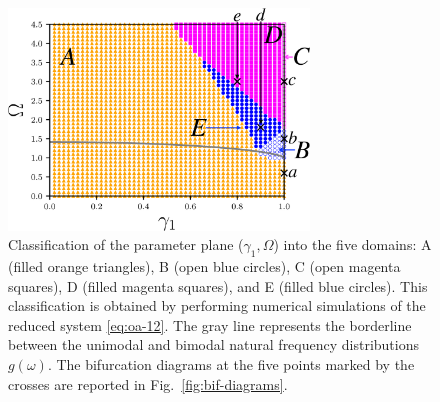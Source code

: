 \begin{figure}
  \centering
  \includegraphics[width=8cm]{figs/pd-na.eps}
  \caption{Classification of the parameter plane
    ($\gamma_{1},\Omega$) into the five domains:
    A (filled orange triangles), B (open blue circles),
    C (open magenta squares),
    D (filled magenta squares), and E (filled blue circles).
    This classification is obtained by performing numerical simulations
    of the reduced system \eqref{eq:oa-12}.
    The gray line represents the borderline between
    the unimodal and bimodal natural frequency distributions $g(\omega)$.
    The bifurcation diagrams at the five points marked by the crosses
    are reported in Fig.~\ref{fig:bif-diagrams}.
    }
  \label{fig:phase-diagram}
\end{figure}



